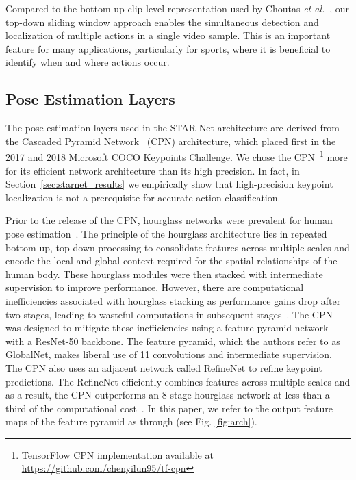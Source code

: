 \documentclass[10pt, conference, compsocconf]{IEEEtran}
\begin{document}
Compared to the bottom-up clip-level representation used by Choutas \textit{et al.}~\cite{choutas2018potion}, our top-down sliding window approach enables the simultaneous detection and localization of multiple actions in a single video sample. This is an important feature for many applications, particularly for sports, where it is beneficial to identify when and where actions occur.

\subsection{Pose Estimation Layers}

The pose estimation layers used in the STAR-Net architecture are derived from the Cascaded Pyramid Network~\cite{chen2017cascaded} (CPN) architecture, which placed first in the 2017 and 2018 Microsoft COCO Keypoints Challenge. We chose the CPN~\footnote{TensorFlow CPN implementation available at \url{https://github.com/chenyilun95/tf-cpn}} more for its efficient network architecture than its high precision. In fact, in Section~\ref{sec:starnet_results} we empirically show that high-precision keypoint localization is not a prerequisite for accurate action classification.  

Prior to the release of the CPN, hourglass networks were prevalent for human pose estimation~\cite{newell2016stacked}. The principle of the hourglass architecture lies in repeated bottom-up, top-down processing to consolidate features across multiple scales and encode the local and global context required for the spatial relationships of the human body. These hourglass modules were then stacked with intermediate supervision to improve performance. However, there are computational inefficiencies associated with hourglass stacking as performance gains drop after two stages, leading to wasteful computations in subsequent stages~\cite{chen2017cascaded}. The CPN was designed to mitigate these inefficiencies using a feature pyramid network~\cite{lin2017feature} with a ResNet-50 \cite{he2016deep} backbone. The feature pyramid, which the authors refer to as GlobalNet, makes liberal use of 11 convolutions and intermediate supervision. The CPN also uses an adjacent network called RefineNet to refine keypoint predictions. The RefineNet efficiently combines features across multiple scales and as a result, the CPN outperforms an 8-stage hourglass network at less than a third of the computational cost~\cite{chen2017cascaded}. In this paper, we refer to the output feature maps of the feature pyramid as  through  (see Fig. \ref{fig:arch}).  
\end{document}
